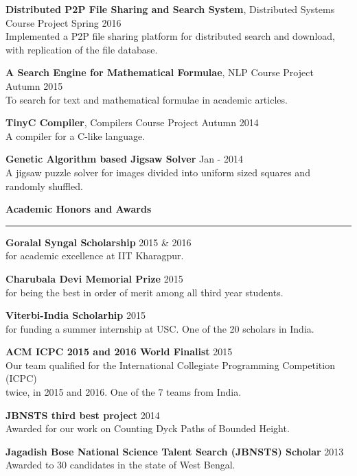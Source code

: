 \documentclass[10pt]{article}
\newcommand{\heading}[1]{
 {\large \textbf{#1}}
  \vspace{0.4em}
  \hrule
  \vspace{0.4em}
}
\newcommand{\EntryGap}{\vspace{0.5cm}}
\newcommand{\SmallEntryGap}{\vspace{0.2cm}}
\begin{document}
  \textbf{Distributed P2P File Sharing and Search System}, Distributed Systems Course Project \hfill Spring 2016\\
  Implemented a P2P file sharing platform for distributed search and download,\\
  with replication of the file database.
  \SmallEntryGap
  
  \textbf{A Search Engine for Mathematical Formulae}, NLP Course Project \hfill Autumn 2015\\
  To search for text and mathematical formulae in academic articles.
  \SmallEntryGap
  
  \textbf{TinyC Compiler}, Compilers Course Project \hfill Autumn 2014\\
  A compiler for a C-like language.
  \SmallEntryGap
  
  \textbf{Genetic Algorithm based Jigsaw Solver} \hfill Jan - 2014\\
  A jigsaw puzzle solver for images divided into uniform sized squares and randomly shuffled.




\EntryGap
\heading{Academic Honors and Awards}
 \SmallEntryGap
 
 \textbf{Goralal Syngal Scholarship} \hfill 2015 \& 2016\\
 for academic excellence at IIT Kharagpur.
 \SmallEntryGap
 
 \textbf{Charubala Devi Memorial Prize} \hfill 2015\\
  for being the best in order of merit among all third year students.
  \SmallEntryGap
  
 \textbf{Viterbi-India Scholarhip} \hfill 2015\\
  for funding a summer internship at USC. One of the 20 scholars in India.
  \SmallEntryGap
  
 \textbf{ACM ICPC 2015 and 2016 World Finalist} \hfill 2015\\
  Our team qualified for the International Collegiate Programming Competition (ICPC)\\
  twice, in 2015 and 2016. One of the 7 teams from India.
  \SmallEntryGap
  
 \textbf{JBNSTS third best project} \hfill 2014\\
  Awarded for our work on Counting Dyck Paths of Bounded Height.
  \SmallEntryGap
  
 \textbf{Jagadish Bose National Science Talent Search (JBNSTS) Scholar} \hfill 2013\\
  Awarded to 30 candidates in the state of West Bengal.
  \SmallEntryGap
  
\end{document}
